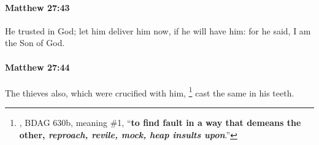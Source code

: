 		\paragraph{Matthew 27:43} %
			\label{MATTHEW-27-43}

			He trusted in God; let him deliver him now, if he will have him: for he said, I am the Son of God.

			\begin{framed}
			\scriptsize
				\begin{compactdesc}
					\item[SBLG] 
				\end{compactdesc}
			\end{framed}

		\paragraph{Matthew 27:44} %
			\label{MATTHEW-27-44}

			The thieves also, which were crucified with him,
				\footnote{%
					, BDAG 630b, meaning \#1, ``\textbf{to find fault in a way that demeans the other, \textit{reproach, revile, mock, heap insults upon}}.''
					}%
			cast the same in his teeth.

